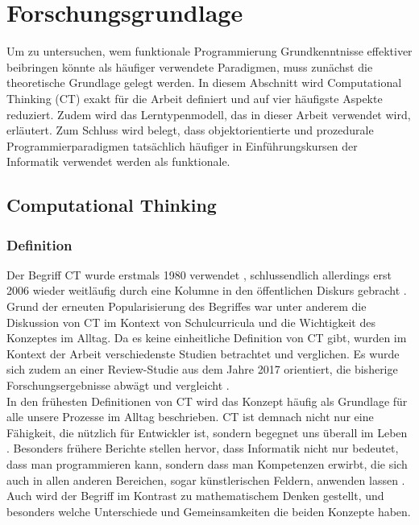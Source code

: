 \clearpage
\section{Forschungsgrundlage}
\label{sec:research}

Um zu untersuchen, wem funktionale Programmierung Grundkenntnisse effektiver beibringen könnte als häufiger verwendete Paradigmen, muss zunächst die theoretische Grundlage gelegt werden. In diesem Abschnitt wird Computational Thinking (CT) exakt für die Arbeit definiert und auf vier häufigste Aspekte reduziert. Zudem wird das Lerntypenmodell, das in dieser Arbeit verwendet wird, erläutert. Zum Schluss wird belegt, dass objektorientierte und prozedurale Programmierparadigmen tatsächlich häufiger in Einführungskursen der Informatik verwendet werden als funktionale.

\subsection{Computational Thinking}

\subsubsection{Definition}
Der Begriff CT wurde erstmals 1980 verwendet \cite{papert}, schlussendlich allerdings erst 2006 wieder weitläufig durch eine Kolumne in den öffentlichen Diskurs gebracht \cite{wing2006}.
Grund der erneuten Popularisierung des Begriffes war unter anderem die Diskussion von CT im Kontext von Schulcurricula und die Wichtigkeit des Konzeptes im Alltag.
Da es keine einheitliche Definition von CT gibt, wurden im Kontext der Arbeit verschiedenste Studien betrachtet und verglichen. Es wurde sich zudem an einer Review-Studie aus dem Jahre 2017 orientiert, die bisherige Forschungsergebnisse abwägt und vergleicht \cite{schute}.
\\
In den frühesten Definitionen von CT wird das Konzept häufig als Grundlage für alle unsere Prozesse im Alltag beschrieben. CT ist demnach nicht nur eine Fähigkeit, die nützlich für Entwickler ist, sondern begegnet uns überall im Leben \cite{khine17}. Besonders frühere Berichte stellen hervor, dass Informatik nicht nur bedeutet, dass man programmieren kann, sondern dass man Kompetenzen erwirbt, die sich auch in allen anderen Bereichen, sogar künstlerischen Feldern, anwenden lassen \cite{wing2006}.
Auch wird der Begriff im Kontrast zu mathematischem Denken gestellt, und besonders welche Unterschiede und Gemeinsamkeiten die beiden Konzepte haben.

